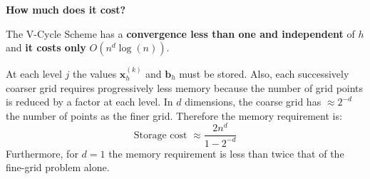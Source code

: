 \begin{flushleft}
    \textcolor{Red2}{ \textbf{How much does it cost?}}
\end{flushleft}
The V-Cycle Scheme has a \textbf{convergence less than one and independent} of $h$ and \textbf{it costs only} $O\left(n^{d} \log\left(n\right)\right)$.

\highspace
At each level $j$ the values $\mathbf{x}_{h}^{\left(k\right)}$ and $\mathbf{b}_{h}$ must be stored. Also, each successively coarser grid requires progressively less memory because the number of grid points is reduced by a factor at each level. In $d$ dimensions, the coarse grid has $\approx 2^{-d}$ the number of points as the finer grid. Therefore the memory requirement is:
\begin{equation*}
    \text{Storage cost } \approx \dfrac{2n^{d}}{1 - 2^{-d}}
\end{equation*}
Furthermore, for $d = 1$ the memory requirement is less than twice that of the fine-grid problem alone.